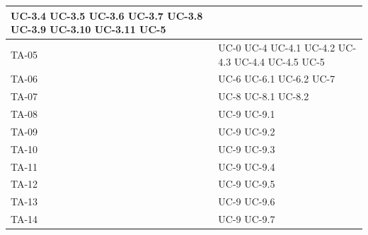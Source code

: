 \documentclass[8pt]{article}
\begin{document}
\begin{longtable}{|>{\centering}p{4cm}|>{\centering\arraybackslash}p{4cm}|}
            UC-3.4 \newline
            UC-3.5 \newline
            UC-3.6 \newline
            UC-3.7 \newline
            UC-3.8 \newline
            UC-3.9 \newline
            UC-3.10 \newline
            UC-3.11 \newline
            UC-5
    \\
    \hline
    TA-05 & UC-0 \newline
            UC-4 \newline 
            UC-4.1 \newline
            UC-4.2 \newline
            UC-4.3 \newline
            UC-4.4 \newline
            UC-4.5 \newline
            UC-5
    \\
    \hline
    TA-06 & UC-6 \newline
            UC-6.1 \newline
            UC-6.2 \newline
            UC-7
    \\
    \hline
    TA-07 & UC-8 \newline
            UC-8.1 \newline
            UC-8.2
    \\
    \hline
    TA-08 & UC-9 \newline
            UC-9.1
    \\
    \hline
    TA-09 & UC-9 \newline
            UC-9.2
    \\
    \hline
    TA-10 & UC-9 \newline
            UC-9.3
    \\
    \hline
    TA-11 & UC-9 \newline
            UC-9.4
    \\
    \hline
    TA-12 & UC-9 \newline
            UC-9.5
    \\
    \hline
    TA-13 & UC-9 \newline
            UC-9.6
    \\
    \hline
    TA-14 & UC-9 \newline
            UC-9.7

\end{longtable}
\end{document}
